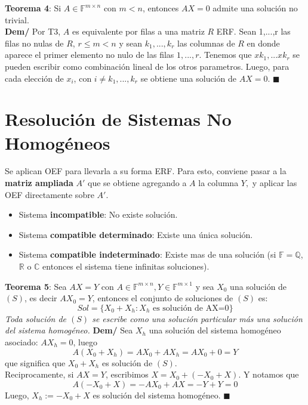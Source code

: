 \documentclass[11pt,a4paper]{article}
\newcommand*{\QEDA}{\null\nobreak\hfill\ensuremath{\blacksquare}}
\begin{document}
\textbf{Teorema 4}: Si  $A \in \mathbb{F}^{m \times n}$ con $m<n$, entonces $AX=0$ admite una soluci\'on no trivial.\\
\textbf{Dem/} Por T3, $A$ es equivalente por filas a una matriz $R$ ERF. Sean 1,...,r las filas no nulas de $R$, $r \leq m < n$ y sean $k_1, ..., k_r$ las columnas de $R$ en donde aparece el primer elemento no nulo de las filas $1,...,r$. Tenemos que $xk_1,...xk_r$ se pueden escribir como combinaci\'on lineal de los otros parametros. Luego, para cada elecci\'on de $x_i$, con $i \not = k_1, ..., k_r$ se obtiene una soluci\'on de $AX = 0$. \QEDA

\section{Resoluci\'on de Sistemas No Homog\'eneos}
Se aplican OEF para llevarla a su forma ERF. Para esto, conviene pasar a la \textbf{matriz ampliada} $A'$ que se obtiene agregando a $A$ la columna $Y,$ y aplicar las OEF directamente sobre $A'$.
\begin{itemize}
\itemsep-0.3em
\item Sistema \textbf{incompatible}: No existe soluci\'on.
\item Sistema \textbf{compatible determinado}: Existe una \'unica soluci\'on.
\item Sistema \textbf{compatible indeterminado}: Existe mas de una soluci\'on (si $\mathbb{F} = \mathbb{Q}$, $\mathbb{R}$ o $\mathbb{C}$ entonces el sistema tiene infinitas soluciones).
\end{itemize}

\textbf{Teorema 5}: Sea $AX=Y$ con $A \in \mathbb{F}^{m \times n}, Y \in \mathbb{F}^{m \times 1}$ y sea $X_0$ una soluci\'on de $(S)$, es decir $AX_0 = Y$, entonces el conjunto de soluciones de $(S)$ es: $$Sol = \{ X_0 + X_h : X_h \text{ es soluci\'on de AX=0} \}$$
\textit{Toda soluci\'on de $(S)$ se escribe como una soluci\'on particular m\'as una soluci\'on del sistema homog\'eneo.}
\textbf{Dem/} Sea $X_h$ una soluci\'on del sistema homog\'eneo asociado: $AX_h = 0$, luego
$$A(X_0 + X_h) = AX_0 + AX_h = AX_0 + 0 = Y$$
que significa que $X_0 + X_h$ es soluci\'on de $(S)$.\\
Reciprocamente, si $AX=Y$, escribimos $X=X_0 + (-X_0 + X)$. Y notamos que 
$$A(-X_0 + X) = -AX_0 + AX = - Y + Y = 0$$
Luego, $X_h := -X_0 + X$ es soluci\'on del sistema homog\'eneo. \QEDA
\end{document}
